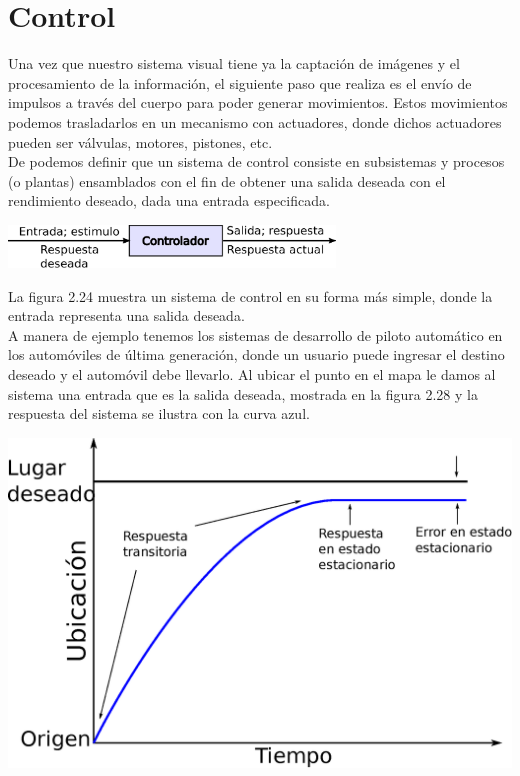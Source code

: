 \section{Control}
Una vez que nuestro sistema visual tiene ya la captación de imágenes y el procesamiento de
la información, el siguiente paso que realiza es el envío de impulsos a través del cuerpo para
poder generar movimientos. Estos movimientos podemos trasladarlos en un mecanismo con actuadores,
donde dichos actuadores pueden ser válvulas, motores, pistones, etc.\\
De \cite{Book:Nise2010} podemos definir que un sistema de control consiste en subsistemas y procesos
(o plantas) ensamblados con el fin de obtener una salida deseada con el rendimiento deseado, dada una
entrada especificada.
\begin{center}
	\includegraphics[width=0.65\textwidth]{Contenido/Cuerpo/Capitulo2/Fig22.eps}
	\label{fig:MarcoTeorico:Fig25}
\end{center}
La figura 2.24 muestra un sistema de control en su forma más simple, donde la entrada representa
una salida deseada.\\
A manera de ejemplo tenemos los sistemas de desarrollo de piloto automático en los automóviles de
última generación, donde un usuario puede ingresar el destino deseado y el automóvil debe llevarlo.
Al ubicar el punto en el mapa le damos al sistema una entrada que es la salida deseada, mostrada
en la figura 2.28 y la respuesta del sistema se ilustra con la curva azul.
\begin{center}
	\includegraphics[width=0.85 \textwidth]{Contenido/Cuerpo/Capitulo2/Fig23.eps}
	\label{fig:MarcoTeorico:Fig25}
\end{center}

